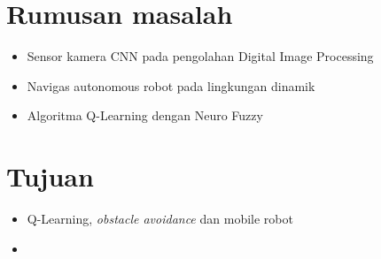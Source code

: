 \section{Rumusan masalah}
\begin{itemize}
	\item Sensor kamera CNN pada pengolahan Digital Image Processing
	\item Navigas autonomous robot pada lingkungan dinamik
	\item Algoritma Q-Learning dengan Neuro Fuzzy
\end{itemize} 


\section{Tujuan}
\begin{itemize}
	\item Q-Learning, \textit{obstacle avoidance} dan mobile robot
	\item 
\end{itemize}
   
